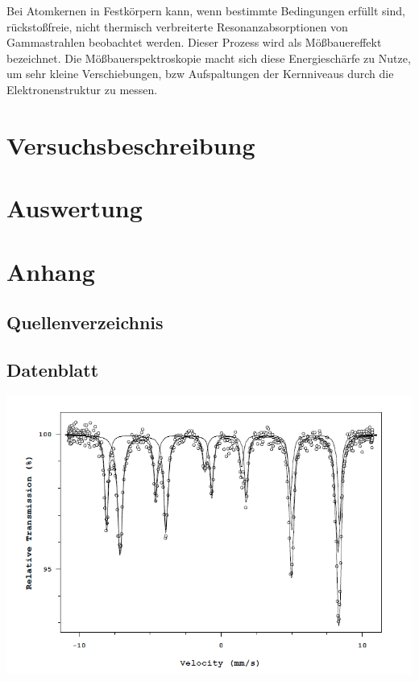 \documentclass[a4paper, 10pt]{scrreprt}
\begin{document}
	Bei Atomkernen in Festkörpern kann, wenn bestimmte Bedingungen erfüllt sind, rückstoßfreie, nicht thermisch verbreiterte Resonanzabsorptionen von Gammastrahlen beobachtet werden. Dieser Prozess wird als Mößbauereffekt bezeichnet. Die Mößbauerspektroskopie macht sich diese Energieschärfe zu Nutze, um sehr kleine Verschiebungen, bzw Aufspaltungen der Kernniveaus durch die Elektronenstruktur zu messen. 

\chapter{Versuchsbeschreibung}
\label{cha:Versuchsbeschreibung}


\chapter{Auswertung}
\label{cha:Auswertung}


	
\chapter{Anhang}
\label{cha:Anhang}
	\section{Quellenverzeichnis}
	
	\section{Datenblatt}
		\includegraphics[scale=.5]{Bilder/Graph.png} 
	
\end{document}
